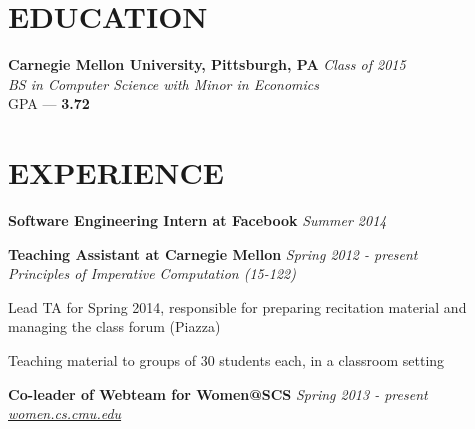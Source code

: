 \documentclass[margin, 11pt]{res} %
\begin{document}
\begin{resume}


\section{EDUCATION}

{\bf Carnegie Mellon University, Pittsburgh, PA} \hfill {\sl Class of 2015}\\
{\sl BS in Computer Science with Minor in Economics } \\
{\small GPA --- \textbf{3.72}}


 
\section{EXPERIENCE}

{\bf Software Engineering Intern at Facebook} \hfill {\sl Summer 2014}
\vspace{3.5pt}

{\bf Teaching Assistant at Carnegie Mellon} \hfill {\sl Spring 2012 - present}\\
{\sl Principles of Imperative Computation (15-122)}

\begin{itemize} \itemsep -2pt
{\small \item Lead TA for Spring 2014, responsible for preparing recitation material and managing the class forum (Piazza)
\item Teaching material to groups of 30 students each, in a classroom setting} 
\end{itemize}

\vspace{3pt}

{\bf Co-leader of Webteam for Women@SCS} \hfill {\sl Spring 2013 - present}\\
\href{{women.cs.cmu.edu}}{\sl women.cs.cmu.edu}


\end{resume}
\end{document}
